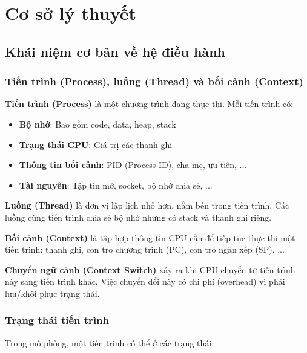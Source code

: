 
\chapter{Cơ sở lý thuyết}
\label{ch:theory}

\section{Khái niệm cơ bản về hệ điều hành}

\subsection{Tiến trình (Process), luồng (Thread) và bối cảnh (Context)}

\textbf{Tiến trình (Process)} là một chương trình đang thực thi. Mỗi tiến trình có:
\begin{itemize}[leftmargin=1.5cm]
  \item \textbf{Bộ nhớ}: Bao gồm code, data, heap, stack
  \item \textbf{Trạng thái CPU}: Giá trị các thanh ghi
  \item \textbf{Thông tin bối cảnh}: PID (Process ID), cha mẹ, ưu tiên, ...
  \item \textbf{Tài nguyên}: Tập tin mở, socket, bộ nhớ chia sẻ, ...
\end{itemize}

\textbf{Luồng (Thread)} là đơn vị lập lịch nhỏ hơn, nằm bên trong tiến trình. 
Các luồng cùng tiến trình chia sẻ bộ nhớ nhưng có stack và thanh ghi riêng.

\textbf{Bối cảnh (Context)} là tập hợp thông tin CPU cần để tiếp tục thực thi một 
tiến trình: thanh ghi, con trỏ chương trình (PC), con trỏ ngăn xếp (SP), ...

\textbf{Chuyển ngữ cảnh (Context Switch)} xảy ra khi CPU chuyển từ tiến trình này sang 
tiến trình khác. Việc chuyển đổi này có chi phí (overhead) vì phải lưu/khôi phục trạng thái.

\subsection{Trạng thái tiến trình}

Trong mô phỏng, một tiến trình có thể ở các trạng thái:

